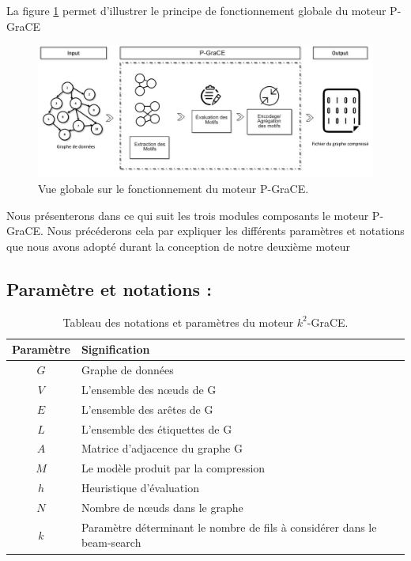 \documentclass[a4paper,oneside,12pt]{report}
\theoremstyle{definition}
\begin{document}
La figure \ref{P_grace} permet d'illustrer le principe de fonctionnement globale du moteur \gls{P-GraCE}


\begin{figure}[H]
	\includegraphics[scale=0.48]{./ressources/image/pgrace.jpg}
	\caption[Vue globale sur le fonctionnement du moteur \gls{P-GraCE}.]{Vue globale sur le fonctionnement du moteur \gls{P-GraCE}.}
	\label{P_grace}
\end{figure}

Nous présenterons dans ce qui suit les trois modules composants le moteur P-GraCE. Nous précéderons  cela par expliquer les différents paramètres et notations que nous avons adopté durant la conception de notre deuxième moteur
		
		\subsection{Paramètre et notations :}
		
			\begin{table}[H]
		\centering
		\begin{tabular}{|c|L{12cm}|}
		\hline Paramètre & Signification \\ \hline\hline 
		$G$ & Graphe de données \\ \hline
		$V$ & L'ensemble des nœuds de G\\ \hline
		$E$ & L'ensemble des arêtes de G \\ \hline
		$L$ & L'ensemble des étiquettes de G \\ \hline
		$A$ & Matrice d'adjacence du graphe G\\ \hline
		$M$ & Le modèle produit par la compression\\ \hline
		$h$ & Heuristique d'évaluation \\ \hline
		$N$ & Nombre de nœuds dans le graphe \\ \hline
		$k$ & Paramètre déterminant le nombre de fils à considérer dans le beam-search\\ \hline
		
		\end{tabular}
		\caption{Tableau des notations et paramètres du moteur $k^2$-GraCE.}	
		\label{notk2grace}		
	\end{table}
		
\end{document}
